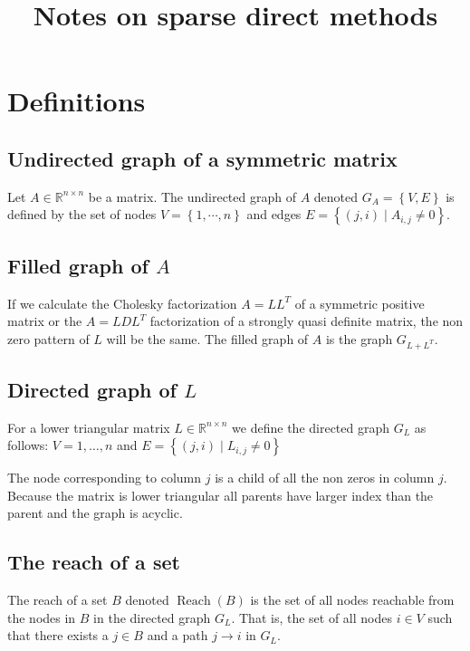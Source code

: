 \documentclass{article}
\begin{document}
\newcommand{\X}{\mathcal{X}}
\newcommand{\T}{\mathcal{T}}
\newcommand{\bigO}{\mathcal{O}}
\renewcommand{\Re}{\mathbb{R}}
\newcommand{\pmat}[1]{\begin{pmatrix}#1\end{pmatrix}}

\title{Notes on sparse direct methods}
\maketitle

\section{Definitions}
\subsection{Undirected graph of a symmetric matrix}

Let $A\in \Re^{n\times n}$ be a matrix. The undirected 
graph of $A$ denoted $G_A=\left\{ V,E \right\}$ is defined by the set of 
nodes $V = \left\{ 1,\cdots,n \right\}$ and 
edges $E = \left\{ (j,i) \mid A_{i,j} \neq 0 \right\}$. 

\subsection{Filled graph of $A$}
If we calculate the Cholesky factorization $A=LL^T$ of a symmetric positive matrix or
the $A=LDL^T$ factorization of a strongly quasi definite matrix, the non zero pattern 
of $L$ will be the same. 
The filled graph of $A$ is the graph $G_{L+L^T}$.

\subsection{Directed graph of $L$}
For a lower triangular matrix $L\in\Re^{n\times n}$ we define the directed
graph $G_L$ as follows: $V = {1,\dots,n}$ and $E = \left\{ (j,i) \mid L_{i,j}
\neq 0 \right\}$

The node corresponding to column $j$ is a child of all the non zeros in column
$j$.  Because the matrix is lower triangular all parents have larger index
than the parent and the graph is acyclic. \cite[Page 30]{Sparse Davis}

\subsection{The reach of a set}
The reach of a set $B$ denoted $\operatorname{Reach}(B)$ is the set of 
all nodes reachable from the nodes in $B$ in the directed graph $G_L$.
That is, the set of all nodes $i\in V$
such that there exists a $j \in B$ and a path $j \to i$ in $G_L$.
\end{document}
